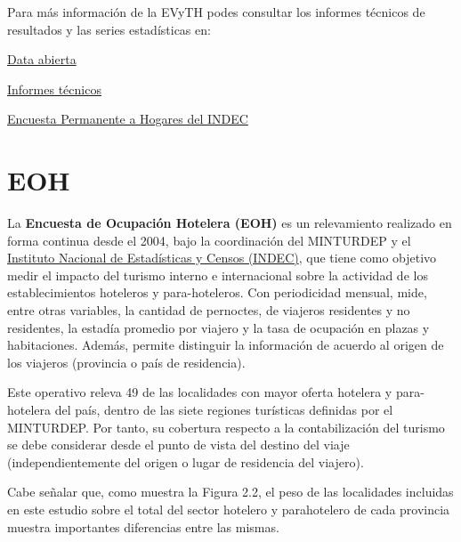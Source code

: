\documentclass[
  openany]{book}
\begin{document}
Para más información de la EVyTH podes consultar los informes técnicos de resultados y las series estadísticas en:

\href{http://datos.yvera.gob.ar/dataset/encuesta-viajes-turismo-hogares-evyth}{Data abierta}

\href{https://www.yvera.tur.ar/estadistica/info/encuesta-de-viajes-y-turismo-de-los-hogares-evyth}{Informes técnicos}

\href{https://www.indec.gob.ar/indec/web/Institucional-Indec-OperacionesEstadisticas}{Encuesta Permanente a Hogares del INDEC}

\hypertarget{eoh}{%
\section{EOH}\label{eoh}}

La \textbf{Encuesta de Ocupación Hotelera (EOH)} es un relevamiento realizado en forma continua desde el 2004, bajo la coordinación del MINTURDEP y el \href{https://www.indec.gob.ar/indec/web/Nivel4-Tema-3-13-56}{Instituto Nacional de Estadísticas y Censos (INDEC)}, que tiene como objetivo medir el impacto del turismo interno e internacional sobre la actividad de los establecimientos hoteleros y para-hoteleros.
Con periodicidad mensual, mide, entre otras variables, la cantidad de pernoctes, de viajeros residentes y no residentes, la estadía promedio por viajero y la tasa de ocupación en plazas y habitaciones.
Además, permite distinguir la información de acuerdo al origen de los viajeros (provincia o país de residencia).

Este operativo releva 49 de las localidades con mayor oferta hotelera y para-hotelera del país, dentro de las siete regiones turísticas definidas por el MINTURDEP.
Por tanto, su cobertura respecto a la contabilización del turismo se debe considerar desde el punto de vista del destino del viaje (independientemente del origen o lugar de residencia del viajero).

Cabe señalar que, como muestra la Figura 2.2, el peso de las localidades incluidas en este estudio sobre el total del sector hotelero y parahotelero de cada provincia muestra importantes diferencias entre las mismas.
\end{document}
